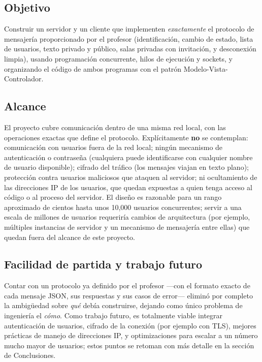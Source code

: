 \documentclass[11pt,letterpaper]{article}
\begin{document}
\subsection*{Objetivo}

Construir un servidor y un cliente que implementen \emph{exactamente} el
protocolo de mensajería proporcionado por el profesor (identificación,
cambio de estado, lista de usuarios, texto privado y público, salas
privadas con invitación, y desconexión limpia), usando programación
concurrente, hilos de ejecución y sockets, y organizando el código de
ambos programas con el patrón Modelo-Vista-Controlador.

\subsection*{Alcance}

El proyecto cubre comunicación dentro de una misma red local, con las
operaciones exactas que define el protocolo. Explícitamente \textbf{no} se
contemplan: comunicación con usuarios fuera de la red local; ningún
mecanismo de autenticación o contraseña (cualquiera puede identificarse con
cualquier nombre de usuario disponible); cifrado del tráfico (los mensajes
viajan en texto plano); protección contra usuarios maliciosos que ataquen
al servidor; ni ocultamiento de las direcciones IP de los usuarios, que
quedan expuestas a quien tenga acceso al código o al proceso del servidor.
El diseño es razonable para un rango aproximado de cientos hasta unos
10{,}000 usuarios concurrentes; servir a una escala de millones de usuarios
requeriría cambios de arquitectura (por ejemplo, múltiples instancias de
servidor y un mecanismo de mensajería entre ellas) que quedan fuera del
alcance de este proyecto.

\subsection*{Facilidad de partida y trabajo futuro}

Contar con un protocolo ya definido por el profesor —con el formato exacto
de cada mensaje JSON, sus respuestas y sus casos de error— eliminó por
completo la ambigüedad sobre \emph{qué} debía construirse, dejando como
único problema de ingeniería el \emph{cómo}. Como trabajo futuro, es
totalmente viable integrar autenticación de usuarios, cifrado de la
conexión (por ejemplo con TLS), mejores prácticas de manejo de direcciones
IP, y optimizaciones para escalar a un número mucho mayor de usuarios; estos
puntos se retoman con más detalle en la sección de Conclusiones.
\end{document}
